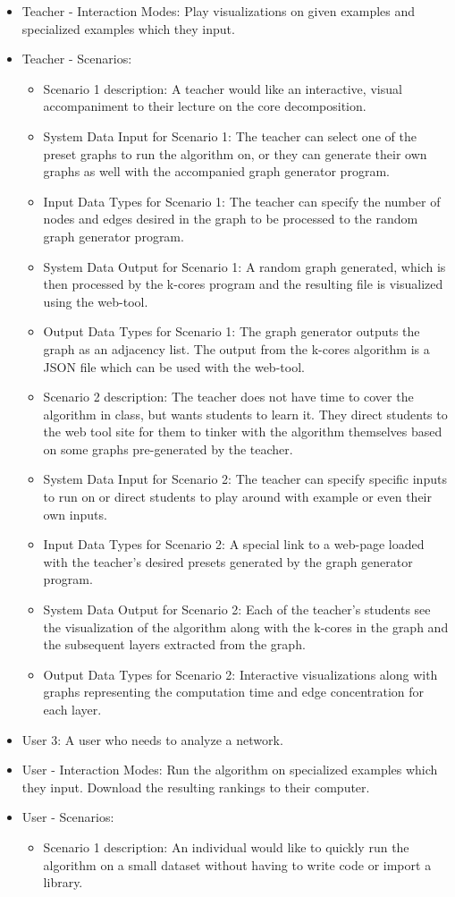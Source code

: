 \begin{itemize}
\item{Teacher - Interaction Modes: }
Play visualizations on given examples and specialized examples which they input.
\item{Teacher - Scenarios: }
	\begin{itemize} 
	\item{Scenario 1 description:}
	A teacher would like an interactive, visual accompaniment to their lecture on the core decomposition. 
	\item{System Data Input for Scenario 1: }
	The teacher can select one of the preset graphs to run the algorithm on, or they can generate their own graphs as well with the accompanied graph generator program.
    \item{Input Data Types for Scenario 1:}
    The teacher can specify the number of nodes and edges desired in the graph to be processed to the random graph generator program. 
	\item{System Data Output for Scenario 1: }
	A random graph generated, which is then processed by the k-cores program and the resulting file is visualized using the web-tool.
    \item {Output Data Types for Scenario 1: }
    The graph generator outputs the graph as an adjacency list. The output from the k-cores algorithm is a JSON file which can be used with the web-tool.
    \item{Scenario 2 description:}
	The teacher does not have time to cover the algorithm in class, but wants students to learn it. They direct students to the web tool site for them to tinker with the algorithm themselves based on some graphs pre-generated by the teacher.
	\item{System Data Input for Scenario 2: }
	The teacher can specify specific inputs to run on or direct students to play around with example or even their own inputs.
    \item{Input Data Types for Scenario 2:}
    A special link to a web-page loaded with the teacher's desired presets generated by the graph generator program.
	\item{System Data Output for Scenario 2: }
	Each of the teacher's students see the visualization of the algorithm along with the k-cores in the graph and the subsequent layers extracted from the graph.
    \item {Output Data Types for Scenario 2: }
    Interactive visualizations along with graphs representing the computation time and edge concentration for each layer.
	\end{itemize}
\item{User 3: } A user who needs to analyze a network.
\item{User - Interaction Modes: }
Run the algorithm on specialized examples which they input. Download the resulting rankings to their computer.
\item{User - Scenarios: }
	\begin{itemize} 
	\item{Scenario 1 description:}
	An individual would like to quickly run the algorithm on a small dataset without having to write code or import a library.
	

\end{itemize}
\end{itemize}
